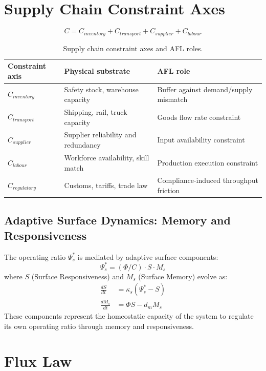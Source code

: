 \documentclass[11pt]{article}
\begin{document}
\section{Supply Chain Constraint Axes}

\begin{equation}
C = C_{inventory} + C_{transport} + C_{supplier} + C_{labour}
\end{equation}

\begin{table}[h]
\centering
\caption{Supply chain constraint axes and AFL roles.}
\begin{tabularx}{\textwidth}{@{}lXX@{}}
\toprule
Constraint axis & Physical substrate & AFL role \\
\midrule
$C_{inventory}$ & Safety stock, warehouse capacity & Buffer against demand/supply mismatch \\
$C_{transport}$ & Shipping, rail, truck capacity & Goods flow rate constraint \\
$C_{supplier}$ & Supplier reliability and redundancy & Input availability constraint \\
$C_{labour}$ & Workforce availability, skill match & Production execution constraint \\
$C_{regulatory}$ & Customs, tariffs, trade law & Compliance-induced throughput friction \\
\bottomrule
\end{tabularx}
\end{table}

\subsection{Adaptive Surface Dynamics: Memory and Responsiveness}

The operating ratio $\Psi_s^*$ is mediated by adaptive surface components:
\begin{equation}
\Psi_s^* = (\Phi/C) \cdot S \cdot M_s
\end{equation}
where $S$ (Surface Responsiveness) and $M_s$ (Surface Memory) evolve as:
\begin{align}
\frac{dS}{dt} &= \kappa_s (\Psi_s^* - S) \\
\frac{dM_s}{dt} &= \Phi S - d_m M_s
\end{align}
These components represent the homeostatic capacity of the system to regulate its own operating ratio through memory and responsiveness.

\section{Flux Law}
\end{document}
